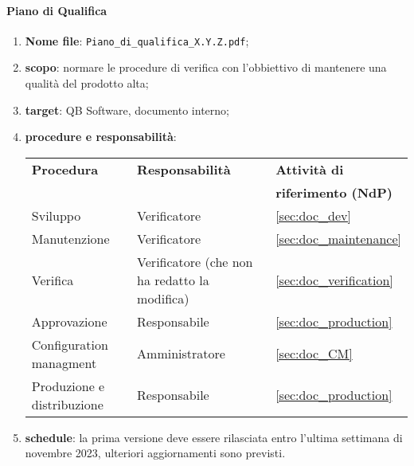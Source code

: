         \paragraph{Piano di Qualifica}
            \begin{enumerate}
                \item \textbf{Nome file}: \texttt{Piano\_di\_qualifica\_X.Y.Z.pdf};
                \item \textbf{scopo}: normare le procedure di verifica con l'obbiettivo di mantenere una qualità del prodotto alta;
                \item \textbf{target}: QB Software, documento interno;
                \item \textbf{procedure e responsabilità}:
                \\
                \begin{tabularx}{0.93\textwidth}{|X|X|X|}
                    \hline
                    \textbf{Procedura} & \textbf{Responsabilità} & \textbf{Attività di} \\
                    & & \textbf{riferimento (NdP)} \\
                    \hline
                    Sviluppo & Verificatore &  \ref{sec:doc_dev}
                    \\\hline
                    Manutenzione & Verificatore & \ref{sec:doc_maintenance} 
                    \\\hline
                    Verifica & Verificatore (che non ha redatto la modifica) & \ref{sec:doc_verification}
                    \\\hline
                    Approvazione & Responsabile & \ref{sec:doc_production}
                    \\\hline
                    Configuration managment & Amministratore & \ref{sec:doc_CM}
                    \\\hline
                    Produzione e distribuzione & Responsabile & \ref{sec:doc_production}
                    \\\hline
                \end{tabularx}
                \item \textbf{schedule}: la prima versione deve essere rilasciata entro l'ultima settimana di novembre 2023, ulteriori aggiornamenti sono previsti.
            \end{enumerate} 

